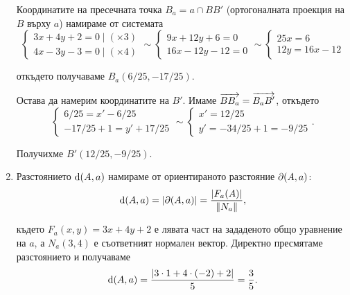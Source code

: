 \documentclass[numbers=endperiod, DIV=15]{scrartcl}
\begin{document}
\begin{solution}
\begin{enumerate}[label=\alph*)]
    Координатите на пресечната точка $B_a = a \cap BB'$ (ортогоналната проекция на $B$ върху $a$) намираме от системата
    \begin{displaymath}
      \begin{cases}
        3x + 4y + 2 = 0 \mid (\times 3) \\
        4x - 3y - 3 = 0 \mid (\times 4)
      \end{cases}
      \sim
      \begin{cases}
        9x + 12y + 6 = 0 \\
        16x - 12y - 12 = 0
      \end{cases}
      \sim
      \begin{cases}
        25x = 6 \\
        12y = 16x - 12
      \end{cases}
    \end{displaymath}

    откъдето получаваме $B_a(6/25, -17/25)$.

    Остава да намерим координатите на $B'$. Имаме $\overrightarrow{BB_a} = \overrightarrow{B_a B'}$, откъдето
    \begin{displaymath}
      \begin{cases}
        6/25 = x' - 6/25 \\
        -17/25 + 1 = y' + 17/25
      \end{cases}
      \sim
      \begin{cases}
        x' = 12/25 \\
        y' = -34/25 + 1 = -9/25
      \end{cases}.
    \end{displaymath}

    Получихме $B'(12/25, -9/25)$.

    \item Разстоянието $\operatorname{d}(A, a)$ намираме от ориентираното разстояние $\partial(A, a)$:
    \begin{displaymath}
      \operatorname{d}(A, a) = \left\vert \partial(A, a) \right\vert = \frac {\left\vert F_a(A) \right\vert} {\left\Vert N_a \right\Vert},
    \end{displaymath}

    където $F_a(x, y) = 3x + 4y + 2$ е лявата част на зададеното общо уравнение на $a$, а $N_a(3, 4)$ е съответният нормален вектор. Директно пресмятаме разстоянието и получаваме
    \begin{displaymath}
      \operatorname{d}(A, a) = \frac {\left\vert 3 \cdot 1 + 4 \cdot (-2) + 2 \right\vert} 5 = \frac 3 5.
    \end{displaymath}


\end{enumerate}
\end{solution}
\end{document}
